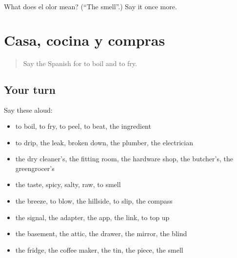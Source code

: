 \begin{tcolorbox}[breakable,colback=teal!4,colframe=teal!35!black,title={Before you move on}]
What does el olor mean? (\textquotedblleft{}The smell\textquotedblright{}.) Say it once more.
\end{tcolorbox}
\section[(dialogue)]{Casa, cocina y compras}

\label{lesson:ES-R775-repaso-768-775}



\begin{quote}
Say the Spanish for to boil and to fry.
\end{quote}

\subsection*{Your turn}
Say these aloud:

\begin{itemize}
\raggedright
  \item to boil, to fry, to peel, to beat, the ingredient
  \item to drip, the leak, broken down, the plumber, the electrician
  \item the dry cleaner's, the fitting room, the hardware shop, the butcher's, the greengrocer's
  \item the taste, spicy, salty, raw, to smell
  \item the breeze, to blow, the hillside, to slip, the compass
  \item the signal, the adapter, the app, the link, to top up
  \item the basement, the attic, the drawer, the mirror, the blind
  \item the fridge, the coffee maker, the tin, the piece, the smell
\end{itemize}

